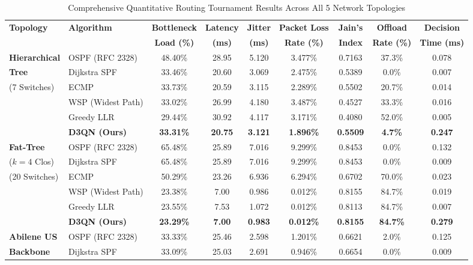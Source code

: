 \begin{table}[htbp]
\centering
\caption{Comprehensive Quantitative Routing Tournament Results Across All 5 Network Topologies}
\label{tab:full_tournament_matrix_ch7}
\scriptsize
\begin{tabularx}{\textwidth}{l l c c c c c c c}
\toprule
\textbf{Topology} & \textbf{Algorithm} & \textbf{Bottleneck} & \textbf{Latency} & \textbf{Jitter} & \textbf{Packet Loss} & \textbf{Jain's} & \textbf{Offload} & \textbf{Decision} \\
& & \textbf{Load (\%)} & \textbf{(ms)} & \textbf{(ms)} & \textbf{Rate (\%)} & \textbf{Index} & \textbf{Rate (\%)} & \textbf{Time (ms)} \\
\midrule
\textbf{Hierarchical} & OSPF (RFC 2328) & 48.40\% & 28.95 & 5.120 & 3.477\% & 0.7163 & 37.3\% & 0.078 \\
\textbf{Tree} & Dijkstra SPF & 33.46\% & 20.60 & 3.069 & 2.475\% & 0.5389 & 0.0\% & 0.007 \\
(7 Switches) & ECMP & 33.73\% & 20.59 & 3.115 & 2.289\% & 0.5502 & 20.7\% & 0.014 \\
& WSP (Widest Path) & 33.02\% & 26.99 & 4.180 & 3.487\% & 0.4527 & 33.3\% & 0.016 \\
& Greedy LLR & 29.44\% & 30.92 & 4.117 & 3.171\% & 0.4080 & 52.0\% & 0.005 \\
& \textbf{D3QN (Ours)} & \textbf{33.31\%} & \textbf{20.75} & \textbf{3.121} & \textbf{1.896\%} & \textbf{0.5509} & \textbf{4.7\%} & \textbf{0.247} \\
\midrule
\textbf{Fat-Tree} & OSPF (RFC 2328) & 65.48\% & 25.89 & 7.016 & 9.299\% & 0.8453 & 0.0\% & 0.132 \\
($k=4$ Clos) & Dijkstra SPF & 65.48\% & 25.89 & 7.016 & 9.299\% & 0.8453 & 0.0\% & 0.009 \\
(20 Switches) & ECMP & 50.29\% & 23.26 & 6.936 & 6.294\% & 0.6702 & 70.0\% & 0.023 \\
& WSP (Widest Path) & 23.38\% & 7.00 & 0.986 & 0.012\% & 0.8155 & 84.7\% & 0.019 \\
& Greedy LLR & 23.55\% & 7.53 & 1.072 & 0.012\% & 0.8113 & 84.7\% & 0.007 \\
& \textbf{D3QN (Ours)} & \textbf{23.29\%} & \textbf{7.00} & \textbf{0.983} & \textbf{0.012\%} & \textbf{0.8155} & \textbf{84.7\%} & \textbf{0.279} \\
\midrule
\textbf{Abilene US} & OSPF (RFC 2328) & 33.33\% & 25.46 & 2.598 & 1.201\% & 0.6621 & 2.0\% & 0.125 \\
\textbf{Backbone} & Dijkstra SPF & 33.09\% & 25.03 & 2.691 & 0.946\% & 0.6654 & 0.0\% & 0.009 \\

\end{tabularx}
\end{table}
